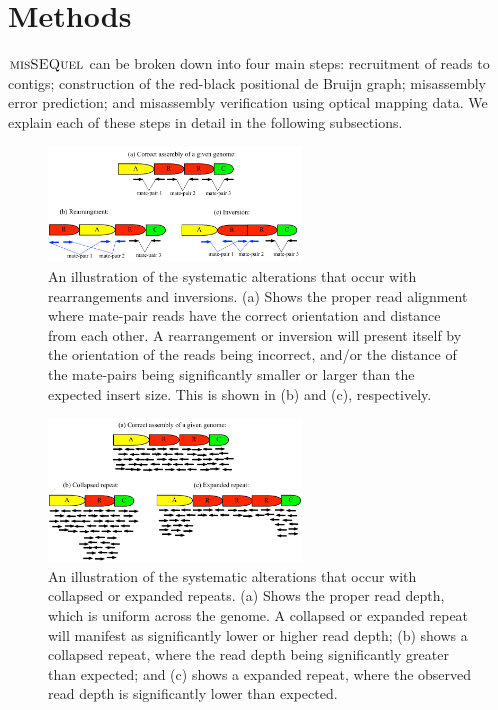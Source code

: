\section{Methods}\label{sec-methods} 

$\mbox{\rm {\sc misSEQuel}}$ can be broken down into four main steps: recruitment of reads to contigs; construction of the red-black positional de Bruijn graph; misassembly error prediction; and misassembly verification using optical mapping data.   
We explain each of these steps in detail in the following subsections. 


        \begin{figure}[h!]
            \centering
              	\includegraphics[width=0.6\textwidth]{./types_of_misassemblies_read_alignment.pdf}
                	\caption{An illustration of the systematic alterations that occur with rearrangements and inversions.  (a) Shows the proper read alignment where mate-pair reads have the correct orientation and distance from each other. A  rearrangement or	inversion will present itself by the orientation of the reads being incorrect, and/or the distance of the mate-pairs being significantly smaller or larger than the expected insert size. This is shown in (b) and (c), respectively.}
                	\label{fig:read_alignment_1}
        \end{figure}
       	\begin{figure}[h!]
		\centering
                	\includegraphics[width=0.6\textwidth]{./types_of_misassemblies_read_alignment_2.pdf}
       		\caption{An illustration of the systematic alterations that occur with collapsed or expanded repeats.  (a) Shows the proper read depth, which is uniform across the genome. A collapsed or expanded repeat will manifest as significantly lower or higher read depth; (b) shows a collapsed repeat, where the read depth being significantly greater than expected; and (c) shows a expanded repeat, where the observed read depth is significantly lower than expected.}
        		\label{fig:read_alignment_2}
        \end{figure}


